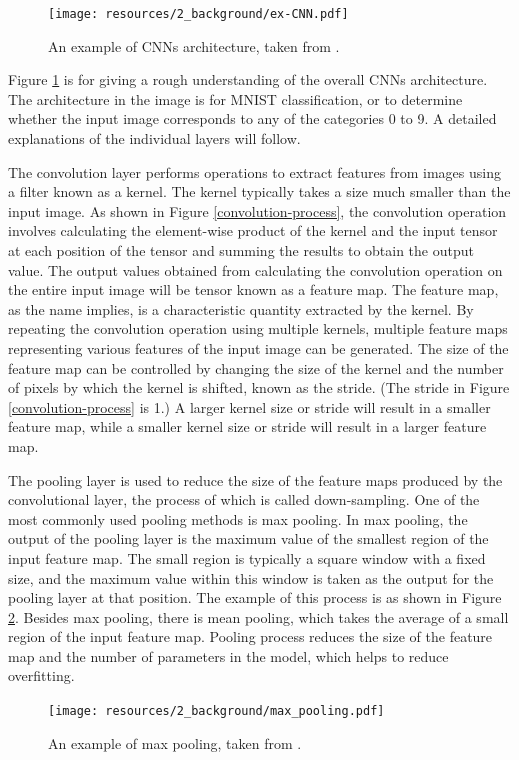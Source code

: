 \begin{figure}[h]
  \centering
  \texttt{[image: resources/2\_background/ex-CNN.pdf]}
  \caption{
    An example of CNNs architecture,
    taken from \cite{o2015introduction}.
  }
  \label{example-of-CNN}
\end{figure}
Figure \ref{example-of-CNN} is for giving a rough understanding of the overall 
CNNs architecture.
The architecture in the image is for MNIST \cite{deng2012mnist} classification, 
or to determine whether the input image corresponds to any of the categories 
0 to 9. A detailed explanations of the individual layers will follow.

The convolution layer performs operations to extract features from images using 
a filter known as a kernel.
The kernel typically takes a size much smaller than the input image. 
As shown in Figure \ref{convolution-process}, the convolution operation involves calculating the 
element-wise product of the kernel and the input tensor at each position of 
the tensor and summing the results to obtain the output value. 
The output values obtained from calculating the convolution operation on the 
entire input image will be tensor known as a feature map.
The feature map, as the name implies, is a characteristic quantity 
extracted by the kernel. By repeating the convolution operation using multiple
kernels, multiple feature maps representing various features of the input 
image can be generated. 
The size of the feature map can be controlled by changing the size of the kernel and the number 
of pixels by which the kernel is shifted, known as the stride. 
(The stride in Figure \ref{convolution-process} is 1.)
A larger kernel size or stride will result in a smaller feature map, 
while a smaller kernel size or stride will result in a larger feature map.


The pooling layer is used to reduce the size of the feature maps produced by 
the convolutional layer, the process of which is called down-sampling. 
One of the most commonly used pooling methods is max pooling.
In max pooling, the output of the pooling layer is the maximum value of 
the smallest region of the input feature map. 
The small region is typically a square window with a fixed size, and the maximum
value within this window is taken as the output for the pooling layer at that position.
The example of this process is as shown in Figure \ref{max-pooling}.
Besides max pooling, there is mean pooling, which takes the average of 
a small region of the input feature map. 
Pooling process reduces the size of the feature map and the number of parameters 
in the model, which helps to reduce overfitting.
\vspace{1.2cm}
\begin{figure}[h]
  \centering
  \texttt{[image: resources/2\_background/max\_pooling.pdf]}
  \caption{
    An example of max pooling,
    taken from \cite{yamashita2018convolutional}.
  }
  \label{max-pooling}
\end{figure}

